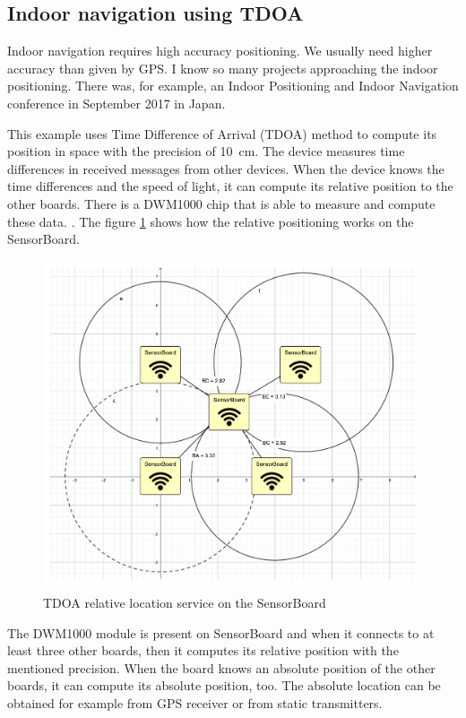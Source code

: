 \subsection{Indoor navigation using \ac{TDOA}}
Indoor navigation requires high accuracy positioning. We usually need higher accuracy than given by GPS. I know so many projects approaching the indoor positioning. There was, for example, an Indoor Positioning and Indoor Navigation conference in September 2017 in Japan.

This example uses Time Difference of Arrival (\ac{TDOA}) method to compute its position in space with the precision of \SI{10}{cm}. The device measures time differences in received messages from other devices. When the device knows the time differences and the speed of light, it can compute its relative position to the other boards. There is a DWM1000 chip that is able to measure and compute these data. \cite{decawave:DWM1000}. The figure \ref{UETDOA} shows how the relative positioning works on the SensorBoard.

\begin{figure}
	\centering
	\label{UETDOA}
	\caption{\ac{TDOA} relative location service on the SensorBoard}
	\includegraphics[trim=5cm 6cm 5cm 5cm, clip, width=15cm]{img/UsageExamplesTDOA.pdf}
\end{figure}

The DWM1000 \cite{decawave:DWM1000} module is present on SensorBoard and when it connects to at least three other boards, then it computes its relative position with the mentioned precision. When the board knows an absolute position of the other boards, it can compute its absolute position, too. The absolute location can be obtained for example from GPS receiver or from static transmitters.

